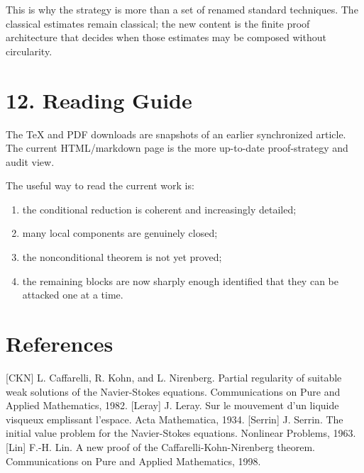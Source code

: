 \documentclass[11pt]{article}
\begin{document}
This is why the strategy is more than a set of renamed standard techniques. The classical estimates remain classical; the new content is the finite proof architecture that decides when those estimates may be composed without circularity.

\section*{12. Reading Guide}

The TeX and PDF downloads are snapshots of an earlier synchronized article. The current HTML/markdown page is the more up-to-date proof-strategy and audit view.

The useful way to read the current work is:

\begin{enumerate}
\item
  the conditional reduction is coherent and increasingly detailed;
\item
  many local components are genuinely closed;
\item
  the nonconditional theorem is not yet proved;
\item
  the remaining blocks are now sharply enough identified that they can be attacked one at a time.
\end{enumerate}

\section*{References}

{[}CKN{]} L. Caffarelli, R. Kohn, and L. Nirenberg. Partial regularity of suitable weak solutions of the Navier-Stokes equations. Communications on Pure and Applied Mathematics, 1982. {[}Leray{]} J. Leray. Sur le mouvement d'un liquide visqueux emplissant l'espace. Acta Mathematica, 1934. {[}Serrin{]} J. Serrin. The initial value problem for the Navier-Stokes equations. Nonlinear Problems, 1963. {[}Lin{]} F.-H. Lin. A new proof of the Caffarelli-Kohn-Nirenberg theorem. Communications on Pure and Applied Mathematics, 1998.
\end{document}
